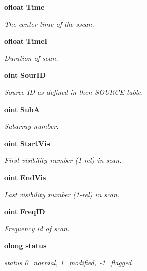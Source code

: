\begin{CompactItemize}
{\bf ofloat} {\bf Time}
\begin{CompactList}\small\item\em The center time of the sscan. \item\end{CompactList}\item 
{\bf ofloat} {\bf Time\-I}
\begin{CompactList}\small\item\em Duration of scan. \item\end{CompactList}\item 
{\bf oint} {\bf Sour\-ID}
\begin{CompactList}\small\item\em Source ID as defined in then SOURCE table. \item\end{CompactList}\item 
{\bf oint} {\bf Sub\-A}
\begin{CompactList}\small\item\em Subarray number. \item\end{CompactList}\item 
{\bf oint} {\bf Start\-Vis}
\begin{CompactList}\small\item\em First visibility number (1-rel) in scan. \item\end{CompactList}\item 
{\bf oint} {\bf End\-Vis}
\begin{CompactList}\small\item\em Last visibility number (1-rel) in scan. \item\end{CompactList}\item 
{\bf oint} {\bf Freq\-ID}
\begin{CompactList}\small\item\em Frequency id of scan. \item\end{CompactList}\item 
{\bf olong} {\bf status}
\begin{CompactList}\small\item\em status 0=normal, 1=modified, -1=flagged \item\end{CompactList}\end{CompactItemize}


